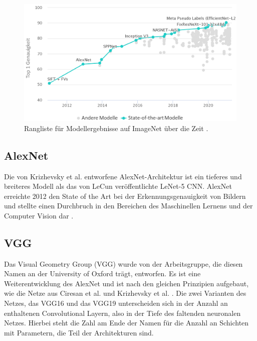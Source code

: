 \begin{figure}[h!]
\centering
\includegraphics[width=14cm]{98_images/imagenet.png}
\caption{Rangliste für Modellergebnisse auf ImageNet über die Zeit \cite{imagenet-leaderboard}.}
\label{fig:imagenet}
\end{figure}


\subsection{AlexNet}
Die von Krizhevsky et al. \cite{imagenet-class-w-deep-cnns} entworfene AlexNet-Architektur ist ein tieferes und breiteres Modell als das von LeCun \cite{lenet-2} veröffentlichte LeNet-5 CNN. AlexNet erreichte 2012 den State of the Art bei der Erkennungsgenauigkeit von Bildern und stellte einen Durchbruch in den Bereichen des Maschinellen Lernens und der Computer Vision dar \cite {the-history-began-from-alexnet}.


\subsection{VGG}\label{sec:vgg-sec}
Das Visual Geometry Group (VGG) wurde von der Arbeitsgruppe, die diesen Namen an der University of Oxford trägt, entworfen. Es ist eine Weiterentwicklung des AlexNet und ist nach den gleichen Prinzipien aufgebaut, wie die Netze aus Ciresan et al. \cite{fleixble-hp-cnns-for-image-classification} und Krizhevsky et al. \cite{imagenet-class-w-deep-cnns}. Die zwei Varianten des Netzes, das VGG16 und das VGG19 unterscheiden sich in der Anzahl an enthaltenen Convolutional Layern, also in der Tiefe des faltenden neuronalen Netzes. Hierbei steht die Zahl am Ende der Namen für die Anzahl an Schichten mit Parametern, die Teil der Architekturen sind. \cite{very-deep-cnns-for-large-scale-img-recognition}

